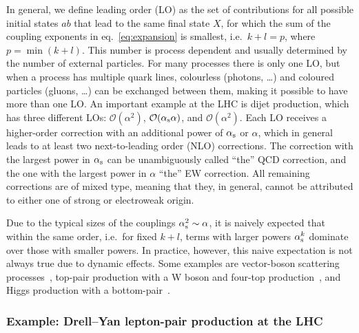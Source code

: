 In general, we define leading order (LO) as the set of contributions for all possible initial states $a b$ that lead to the same final state $X$, for which the sum of the coupling exponents in eq.~\eqref{eq:expansion} is smallest, i.e.\ $k + l = p$, where $p = \min (k+l)$.
This number is process dependent and usually determined by the number of external particles.
For many processes there is only one LO, but when a process has multiple quark lines, colourless (photons, \dots) and coloured particles (gluons, \ldots) can be exchanged between them, making it possible to have more than one LO.
An important example at the LHC is dijet production, which has three different LOs: $\mathcal{O} (\alpha^2)$, $\mathcal{O} (\alpha_\mathrm{s} \alpha)$, and $\mathcal{O} (\alpha^2)$.
Each LO receives a higher-order correction with an additional power of $\alpha_\mathrm{s}$ or $\alpha$, which in general leads to at least two next-to-leading order (NLO) corrections.
The correction with the largest power in $\alpha_\mathrm{s}$ can be unambiguously called \enquote{the} QCD correction, and the one with the largest power in $\alpha$ \enquote{the} EW correction.
All remaining corrections are of mixed type, meaning that they, in general, cannot be attributed to either one of strong or electroweak origin.

Due to the typical sizes of the couplings $\alpha_\mathrm{s}^2 \sim \alpha$, it is naively expected that within the same order, i.e.\ for fixed $k + l$, terms with larger powers $\alpha_\mathrm{s}^k$ dominate over those with smaller powers.
In practice, however, this naive expectation is not always true due to dynamic effects.
Some examples are vector-boson scattering processes~\cite{Biedermann:2017bss,Denner:2019tmn}, top-pair production with a W boson and four-top production~\cite{Frederix:2017wme}, and Higgs production with a bottom-pair~\cite{Pagani:2020rsg}.

\subsubsection{Example: Drell--Yan lepton-pair production at the LHC}
\label{sec:pineappl-example}

